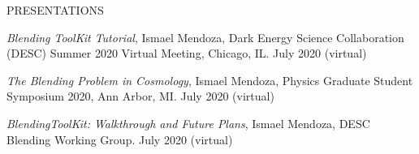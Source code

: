 \begin{rSection}{PRESENTATIONS}
%
\vspace*{-1em}
\item  \textit{Blending ToolKit Tutorial}, Ismael Mendoza, Dark Energy Science Collaboration (DESC) Summer 2020 Virtual Meeting, Chicago, IL. July 2020 (virtual)
%
\item \textit{The Blending Problem in Cosmology}, Ismael Mendoza, Physics Graduate Student Symposium 2020, Ann Arbor, MI. July 2020 (virtual)
%
\item \textit{BlendingToolKit: Walkthrough and Future Plans}, Ismael Mendoza, DESC Blending Working Group. July 2020 (virtual)
\end{rSection}


